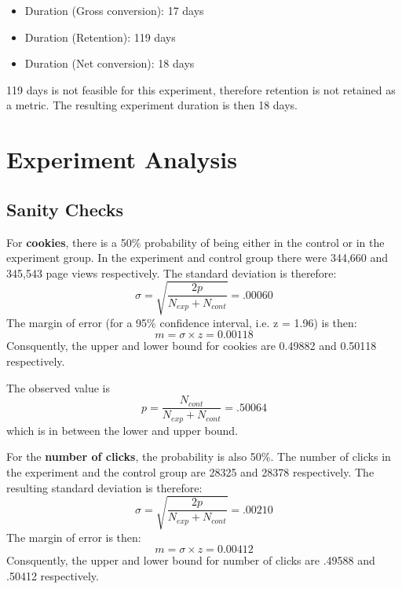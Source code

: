 \documentclass[11pt]{article} %
\begin{document}
\begin{itemize}
\item Duration (Gross conversion): 17 days
\item Duration (Retention):        119 days
\item Duration (Net conversion):   18 days
\end{itemize}
119 days is not feasible for this experiment, therefore retention is not retained as a metric. The resulting experiment duration is then 18 days.

\section{Experiment Analysis}
\subsection{Sanity Checks}

For \textbf{cookies}, there is a 50\% probability of being either in the control or in the experiment group. In the experiment and control group there were 344,660 and 345,543 page views respectively. The standard deviation is therefore:
\begin{equation}
	\sigma = \sqrt{\frac{2p}{N_{exp} + N_{cont}}} = .00060
\end{equation}
The margin of error (for a 95\% confidence interval, i.e. z = 1.96) is then:
\begin{equation}
	m = \sigma \times z = 0.00118
\end{equation}
Consquently, the upper and lower bound for cookies are 0.49882 and 0.50118 respectively.\medskip

The observed value is 
\begin{equation}
	p = \frac{N_{cont}}{N_{exp}+N_{cont}} = .50064
\end{equation}
which is in between the lower and upper bound.\medskip

For the \textbf{number of clicks}, the probability is also 50\%. The number of clicks in the experiment and the control group are 28325 and 28378 respectively. The resulting standard deviation is therefore:
\begin{equation}
	\sigma = \sqrt{\frac{2p}{N_{exp} + N_{cont}}} = .00210
\end{equation}
The margin of error is then:
\begin{equation}
	m = \sigma \times z = 0.00412
\end{equation}
Consquently, the upper and lower bound for number of clicks are .49588  and .50412 respectively.\medskip
\end{document}
